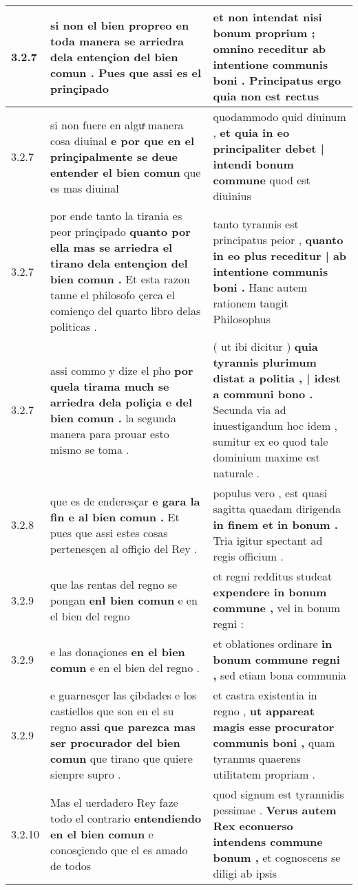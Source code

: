 \begin{tabular}{|p{1cm}|p{6.5cm}|p{6.5cm}|}
3.2.7 & si non el bien propreo \textbf{ en toda manera se arriedra dela entençion del bien comun . } Pues que assi es el prinçipado & et non intendat nisi bonum proprium ; \textbf{ omnino receditur ab intentione communis boni . } Principatus ergo quia non est rectus \\\hline
3.2.7 & si non fuere en alguͣ manera cosa diuinal \textbf{ e por que en el prinçipalmente se deue entender el bien comun } que es mas diuinal & quodammodo quid diuinum , \textbf{ et quia in eo principaliter debet | intendi bonum commune } quod est diuinius \\\hline
3.2.7 & por ende tanto la tirania es peor prinçipado \textbf{ quanto por ella mas se arriedra el tirano dela entençion del bien comun . } Et esta razon tanne el philosofo çerca el comienço del quarto libro delas politicas . & tanto tyrannis est principatus peior , \textbf{ quanto in eo plus receditur | ab intentione communis boni . } Hanc autem rationem tangit Philosophus \\\hline
3.2.7 & assi commo y dize el pho \textbf{ por quela tirama much se arriedra dela poliçia e del bien comun . } la segunda manera para prouar esto mismo se toma . & ( ut ibi dicitur ) \textbf{ quia tyrannis plurimum distat a politia , | idest a communi bono . } Secunda via ad inuestigandum hoc idem , sumitur ex eo quod tale dominium maxime est naturale . \\\hline
3.2.8 & que es de enderesçar \textbf{ e gara la fin e al bien comun . } Et pues que assi estes cosas pertenesçen al offiçio del Rey . & populus vero , est quasi sagitta quaedam dirigenda \textbf{ in finem et in bonum . } Tria igitur spectant ad regis officium . \\\hline
3.2.9 & que las rentas del regno se pongan \textbf{ enł bien comun } e en el bien del regno & et regni redditus studeat \textbf{ expendere in bonum commune , } vel in bonum regni : \\\hline
3.2.9 & e las donaçiones \textbf{ en el bien comun } e en el bien del regno . & et oblationes ordinare \textbf{ in bonum commune regni , } sed etiam bona communia \\\hline
3.2.9 & e guarnesçer las çibdades e los castiellos que son en el su regno \textbf{ assi que parezca mas ser procurador del bien comun } que tirano que quiere sienpre supro . & et castra existentia in regno , \textbf{ ut appareat magis esse procurator communis boni , } quam tyrannus quaerens utilitatem propriam . \\\hline
3.2.10 & Mas el uerdadero Rey faze todo el contrario \textbf{ entendiendo en el bien comun } e conosçiendo que el es amado de todos & quod signum est tyrannidis pessimae . \textbf{ Verus autem Rex econuerso intendens commune bonum , } et cognoscens se diligi ab ipsis \\\hline

\end{tabular}

